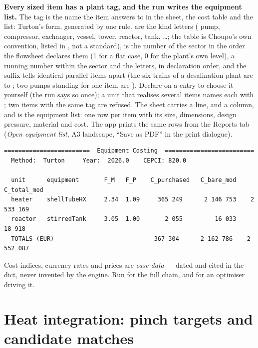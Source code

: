 \documentclass[11pt,a4paper]{article}
\begin{document}
\textbf{Every sized item has a plant tag, and the run writes the equipment
list.} The tag is the name the item answers to in the sheet, the cost table and
the list: Turton's  form, generated by one rule.  are
the kind letters ( pump,  compressor,  exchanger,
 vessel,  tower,  reactor,  tank, \dots; the
table is Choupo's own convention, listed in ,
not a standard),  is the number of the sector in the order the
flowsheet declares them (1 for a flat case, 0 for the plant's own level),
 a running number within the sector and the letters, in declaration
order, and the suffix tells identical parallel items apart (the six trains of a
desalination plant are  to ; two pumps standing for
one item are ). Declare  on a
 entry to choose it yourself (the run says so once); a unit that
realises several items names each with ; two items with the same tag are refused. The sheet
carries a  line,  and  a 
column, and  is the equipment list:
one row per item with its size, dimensions, design pressure, material and cost.
The app prints the same rows from the Reports tab (\emph{Open equipment list},
A3 landscape, ``Save as PDF'' in the print dialogue).

\begin{lstlisting}
========================  Equipment Costing  =========================
  Method:  Turton     Year:  2026.0    CEPCI: 820.0

  unit      equipment       F_M   F_P    C_purchased   C_bare_mod    C_total_mod
  heater    shellTubeHX     2.34  1.09     365 249      2 146 753    2 533 169
  reactor   stirredTank     3.05  1.00       2 055         16 033       18 918
  TOTALS (EUR)                            367 304      2 162 786    2 552 087
\end{lstlisting}

Cost indices, currency rates and prices are \emph{case data} --- dated
and cited in the dict, never invented by the engine.  Run
 for the full
chain, and  for an optimiser driving it.

\section{Heat integration: pinch targets and candidate matches}\label{sec:pinch}
\end{document}
